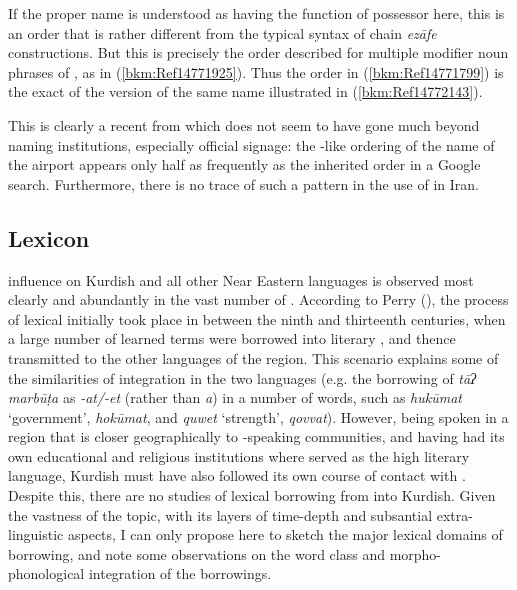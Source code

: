 \documentclass[output=paper]{langsci/langscibook}
\begin{document}
If the proper name is understood as having the function of possessor here, this is an order that is rather different from the typical  syntax of chain \textit{ezāfe} constructions. But this is precisely the order described for multiple modifier noun phrases of , as in (\ref{bkm:Ref14771925}). Thus the order in (\ref{bkm:Ref14771799}) is the exact  of the  version of the same name illustrated in (\ref{bkm:Ref14772143}).


This is clearly a recent  from  which does not seem to have gone much beyond naming institutions, especially official signage: the -like ordering of the name of the airport appears only half as frequently as the inherited order in a Google search. Furthermore, there is no trace of such a  pattern in the use of  in Iran.  

\subsection{Lexicon}

 influence on Kurdish and all other Near Eastern languages is observed most clearly and abundantly in the vast number of . According to Perry (\citeyear[97]{Perry2005}), the process of lexical  initially took place in  between the ninth and thirteenth centuries, when a large number of learned terms were borrowed into literary , and thence transmitted to the other languages of the region. This scenario explains some of the similarities of  integration in the two languages (e.g. the borrowing of \textit{tāʔ} \textit{marbūṭa} as \textit{{}-at/-et} (rather than \textit{a}) in a number of words, such as \textit{hukūmat} ‘government’,  \textit{hokūmat}, and \textit{quwet} ‘strength’,  \textit{qovvat}). However, being spoken in a region that is closer geographically to -speaking communities, and having had its own educational and religious institutions where  served as the high literary language, Kurdish must have also followed its own course of contact with . Despite this, there are no studies of lexical borrowing from  into Kurdish. Given the vastness of the topic, with its layers of time-depth and subsantial extra-linguistic aspects, I can only propose here to sketch the major lexical domains of borrowing, and note some observations on the word class and morpho-phonological integration of the borrowings. 
\end{document}
